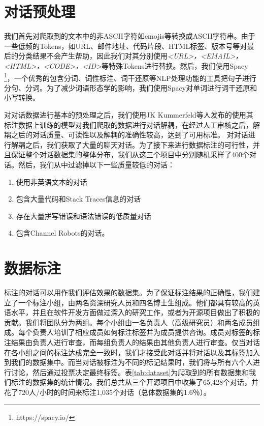 \section{对话预处理}
我们首先对爬取到的文本中的非ASCII字符如emojis等转换成ASCII字符串。由于一些低频的Tokens，如URL、邮件地址、代码片段、HTML标签、版本号等对最后的分类结果不会产生帮助，因此我们对其分别使用\textit{<URL>，<EMAIL>，<HTML>，<CODE>，<ID>}等特殊Tokens进行替换。然后，我们使用Spacy \footnote{https://spacy.io/}，一个优秀的包含分词、词性标注、词干还原等NLP处理功能的工具把句子进行分句、分词。为了减少词语形态学的影响，我们使用Spacy对单词进行词干还原和小写转换。

对对话数据进行基本的预处理之后，我们使用JK Kummerfeld等人\cite{kummerfeld2018large}发布的使用其标注数据上训练的模型对我们爬取的数据进行对话解耦，在经过人工审核之后，解耦之后的对话质量、可读性以及解耦的准确性较高，达到了可用标准。
对对话进行解耦之后，我们获取了大量的聊天对话。为了接下来进行数据标注的可行性，并且保证整个对话数据集的整体分布，我们从这三个项目中分别随机采样了400个对话。然后，我们从中过滤掉以下一些质量较低的对话：
\begin{enumerate}
    \item 使用非英语文本的对话
    \item 包含大量代码和Stack Traces信息的对话
    \item 存在大量拼写错误和语法错误的低质量对话
    \item 包含Channel Robots的对话。
\end{enumerate}

\section{数据标注}
标注的对话可以用作我们评估效果的数据集。为了保证标注结果的正确性，我们建立了一个标注小组，由两名资深研究人员和四名博士生组成。他们都具有较高的英语水平，并且在软件开发方面做过深入的研究工作，或者为开源项目做出了积极的贡献。我们将团队分为两组。每个小组由一名负责人（高级研究员）和两名成员组成。每个负责人培训了相应成员如何标注标签并为成员提供咨询。成员对标签的标注结果由负责人进行审查，而每组负责人的结果由其他负责人进行审查。仅当对话在各小组之间的标注达成完全一致时，我们才接受此对话并将对话以及其标签加入到我们的数据集中。而当对话被标注为不同的标记结果时，我们将与所有六个人进行讨论，然后通过投票决定最终标签。表\ref{tab:dataset}为爬取到的所有数据集和我们标注的数据集的统计情况。我们总共从三个开源项目中收集了65,428个对话，并花了720人/小时的时间来标注1,035个对话（总体数据集的1.6％）。

